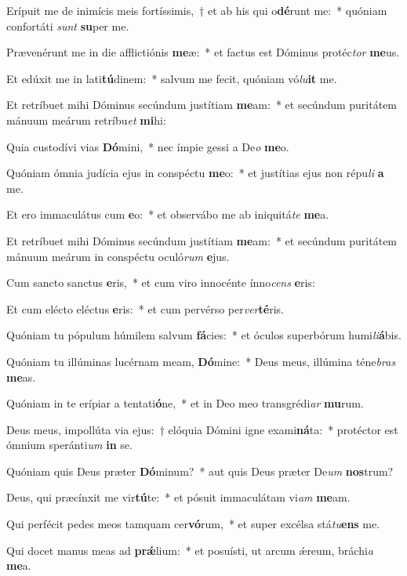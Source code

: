\item Erípuit me de inimícis meis fortíssimis,~† et ab his qui o\textbf{dé}runt me:~* quóniam confortáti \textit{sunt} \textbf{su}per me.
\item Prævenérunt me in die afflictiónis \textbf{me}æ:~* et factus est Dóminus protéc\textit{tor} \textbf{me}us.
\item Et edúxit me in lati\textbf{tú}dinem:~* salvum me fecit, quóniam vó\textit{lu}\textbf{it} me.
\item Et retríbuet mihi Dóminus secúndum justítiam \textbf{me}am:~* et secúndum puritátem mánuum meárum retríbu\textit{et} \textbf{mi}hi:
\item Quia custodívi vias \textbf{Dó}mini,~* nec ímpie gessi a De\textit{o} \textbf{me}o.
\item Quóniam ómnia judícia ejus in conspéctu \textbf{me}o:~* et justítias ejus non répu\textit{li} \textbf{a} me.
\item Et ero immaculátus cum \textbf{e}o:~* et observábo me ab iniquitá\textit{te} \textbf{me}a.
\item Et retríbuet mihi Dóminus secúndum justítiam \textbf{me}am:~* et secúndum puritátem mánuum meárum in conspéctu oculó\textit{rum} \textbf{e}jus.
\item Cum sancto sanctus \textbf{e}ris,~* et cum viro innocénte ínno\textit{cens} \textbf{e}ris:
\item Et cum elécto eléctus \textbf{e}ris:~* et cum pervérso per\textit{ver}\textbf{té}ris.
\item Quóniam tu pópulum húmilem salvum \textbf{fá}cies:~* et óculos superbórum humi\textit{li}\textbf{á}bis.
\item Quóniam tu illúminas lucérnam meam, \textbf{Dó}mine:~* Deus meus, illúmina téne\textit{bras} \textbf{me}as.
\item Quóniam in te erípiar a tentati\textbf{ó}ne,~* et in Deo meo transgrédi\textit{ar} \textbf{mu}rum.
\item Deus meus, impollúta via ejus:~† elóquia Dómini igne exami\textbf{ná}ta:~* protéctor est ómnium speránti\textit{um} \textbf{in} se.
\item Quóniam quis Deus præter \textbf{Dó}minum?~* aut quis Deus præter De\textit{um} \textbf{nos}trum?
\item Deus, qui præcínxit me vir\textbf{tú}te:~* et pósuit immaculátam vi\textit{am} \textbf{me}am.
\item Qui perfécit pedes meos tamquam cer\textbf{vó}rum,~* et super excélsa stá\textit{tu}\textbf{ens} me.
\item Qui docet manus meas ad \textbf{prǽ}lium:~* et posuísti, ut arcum ǽreum, bráchi\textit{a} \textbf{me}a.
